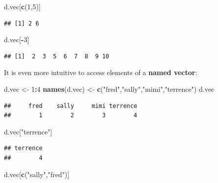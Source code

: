 \documentclass[]{article}
\newenvironment{Shaded}{\begin{snugshade}}{\end{snugshade}}
\newcommand{\KeywordTok}[1]{\textcolor[rgb]{0.13,0.29,0.53}{\textbf{#1}}}
\newcommand{\DecValTok}[1]{\textcolor[rgb]{0.00,0.00,0.81}{#1}}
\newcommand{\StringTok}[1]{\textcolor[rgb]{0.31,0.60,0.02}{#1}}
\newcommand{\OperatorTok}[1]{\textcolor[rgb]{0.81,0.36,0.00}{\textbf{#1}}}
\newcommand{\NormalTok}[1]{#1}
\begin{document}
\begin{Shaded}
\begin{Highlighting}[]
\NormalTok{d.vec[}\KeywordTok{c}\NormalTok{(}\DecValTok{1}\NormalTok{,}\DecValTok{5}\NormalTok{)]}
\end{Highlighting}
\end{Shaded}

\begin{verbatim}
## [1] 2 6
\end{verbatim}

\begin{Shaded}
\begin{Highlighting}[]
\NormalTok{d.vec[}\OperatorTok{-}\DecValTok{3}\NormalTok{]}
\end{Highlighting}
\end{Shaded}

\begin{verbatim}
## [1]  2  3  5  6  7  8  9 10
\end{verbatim}

It is even more intuitive to access elements of a \textbf{named vector}:

\begin{Shaded}
\begin{Highlighting}[]
\NormalTok{d.vec <-}\StringTok{ }\DecValTok{1}\OperatorTok{:}\DecValTok{4}
\KeywordTok{names}\NormalTok{(d.vec) <-}\StringTok{ }\KeywordTok{c}\NormalTok{(}\StringTok{"fred"}\NormalTok{,}\StringTok{"sally"}\NormalTok{,}\StringTok{"mimi"}\NormalTok{,}\StringTok{"terrence"}\NormalTok{)}
\NormalTok{d.vec}
\end{Highlighting}
\end{Shaded}

\begin{verbatim}
##     fred    sally     mimi terrence 
##        1        2        3        4
\end{verbatim}

\begin{Shaded}
\begin{Highlighting}[]
\NormalTok{d.vec[}\StringTok{"terrence"}\NormalTok{]}
\end{Highlighting}
\end{Shaded}

\begin{verbatim}
## terrence 
##        4
\end{verbatim}

\begin{Shaded}
\begin{Highlighting}[]
\NormalTok{d.vec[}\KeywordTok{c}\NormalTok{(}\StringTok{"sally"}\NormalTok{,}\StringTok{"fred"}\NormalTok{)]}
\end{Highlighting}
\end{Shaded}
\end{document}
